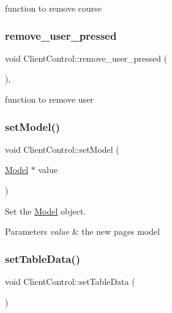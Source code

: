 function to remove course 

\mbox{\label{classClientControl_a09604fd71dee98f12cd46c3252f1cabe}} 
\subsubsection{\texorpdfstring{remove\+\_\+user\+\_\+pressed}{remove\_user\_pressed}}
{\footnotesize\ttfamily void Client\+Control\+::remove\+\_\+user\+\_\+pressed (\begin{DoxyParamCaption}{ }\end{DoxyParamCaption})\hspace{0.3cm}{\ttfamily [private]}, {\ttfamily [slot]}}



function to remove user 

\mbox{\label{classClientControl_a3713d76eb6439b0764809e49bc7662ee}} 
\subsubsection{\texorpdfstring{set\+Model()}{setModel()}}
{\footnotesize\ttfamily void Client\+Control\+::set\+Model (\begin{DoxyParamCaption}\item[{\hyperlink{classModel}{Model} $\ast$}]{value }\end{DoxyParamCaption})}



Set the \hyperlink{classModel}{Model} object. 


\begin{DoxyParams}{Parameters}
{\em value} & the new page\textquotesingle{}s model \\
\hline
\end{DoxyParams}
\mbox{\label{classClientControl_aa3d376fbe49768251c1bf674a10c9944}} 
\subsubsection{\texorpdfstring{set\+Table\+Data()}{setTableData()}}
{\footnotesize\ttfamily void Client\+Control\+::set\+Table\+Data (\begin{DoxyParamCaption}{ }\end{DoxyParamCaption})}



